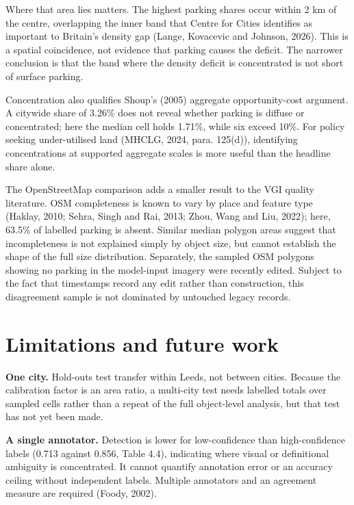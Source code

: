 Where that area lies matters. The highest parking shares occur within 2 km of the centre, overlapping the inner band that Centre for Cities identifies as important to Britain's density gap (Lange, Kovacevic and Johnson, 2026). This is a spatial coincidence, not evidence that parking causes the deficit. The narrower conclusion is that the band where the density deficit is concentrated is not short of surface parking.

Concentration also qualifies Shoup's (2005) aggregate opportunity-cost argument. A citywide share of 3.26\% does not reveal whether parking is diffuse or concentrated; here the median cell holds 1.71\%, while six exceed 10\%. For policy seeking under-utilised land (MHCLG, 2024, para. 125(d)), identifying concentrations at supported aggregate scales is more useful than the headline share alone.

The OpenStreetMap comparison adds a smaller result to the VGI quality literature. OSM completeness is known to vary by place and feature type (Haklay, 2010; Sehra, Singh and Rai, 2013; Zhou, Wang and Liu, 2022); here, 63.5\% of labelled parking is absent. Similar median polygon areas suggest that incompleteness is not explained simply by object size, but cannot establish the shape of the full size distribution. Separately, the sampled OSM polygons showing no parking in the model-input imagery were recently edited. Subject to the fact that timestamps record any edit rather than construction, this disagreement sample is not dominated by untouched legacy records.

\hypertarget{limitations-and-future-work}{%
\section{Limitations and future work}\label{limitations-and-future-work}}

\textbf{One city.} Hold-outs test transfer within Leeds, not between cities. Because the calibration factor is an area ratio, a multi-city test needs labelled totals over sampled cells rather than a repeat of the full object-level analysis, but that test has not yet been made.

\textbf{A single annotator.} Detection is lower for low-confidence than high-confidence labels (0.713 against 0.856, Table 4.4), indicating where visual or definitional ambiguity is concentrated. It cannot quantify annotation error or an accuracy ceiling without independent labels. Multiple annotators and an agreement measure are required (Foody, 2002).

